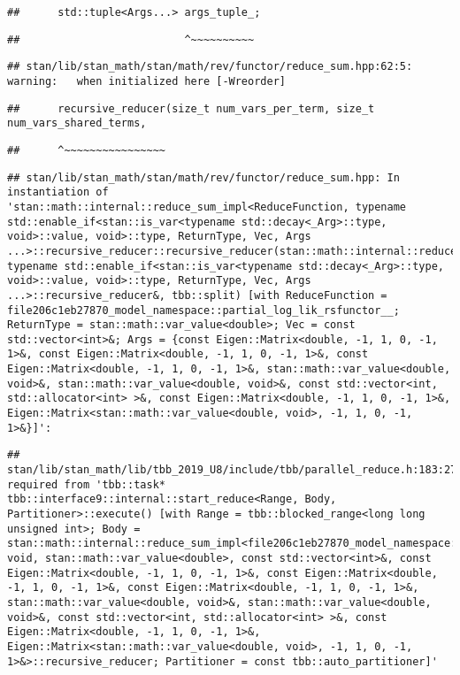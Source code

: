\documentclass[
]{article}
\begin{document}
\begin{verbatim}
##      std::tuple<Args...> args_tuple_;
\end{verbatim}

\begin{verbatim}
##                          ^~~~~~~~~~~
\end{verbatim}

\begin{verbatim}
## stan/lib/stan_math/stan/math/rev/functor/reduce_sum.hpp:62:5: warning:   when initialized here [-Wreorder]
\end{verbatim}

\begin{verbatim}
##      recursive_reducer(size_t num_vars_per_term, size_t num_vars_shared_terms,
\end{verbatim}

\begin{verbatim}
##      ^~~~~~~~~~~~~~~~~
\end{verbatim}

\begin{verbatim}
## stan/lib/stan_math/stan/math/rev/functor/reduce_sum.hpp: In instantiation of 'stan::math::internal::reduce_sum_impl<ReduceFunction, typename std::enable_if<stan::is_var<typename std::decay<_Arg>::type, void>::value, void>::type, ReturnType, Vec, Args ...>::recursive_reducer::recursive_reducer(stan::math::internal::reduce_sum_impl<ReduceFunction, typename std::enable_if<stan::is_var<typename std::decay<_Arg>::type, void>::value, void>::type, ReturnType, Vec, Args ...>::recursive_reducer&, tbb::split) [with ReduceFunction = file206c1eb27870_model_namespace::partial_log_lik_rsfunctor__; ReturnType = stan::math::var_value<double>; Vec = const std::vector<int>&; Args = {const Eigen::Matrix<double, -1, 1, 0, -1, 1>&, const Eigen::Matrix<double, -1, 1, 0, -1, 1>&, const Eigen::Matrix<double, -1, 1, 0, -1, 1>&, stan::math::var_value<double, void>&, stan::math::var_value<double, void>&, const std::vector<int, std::allocator<int> >&, const Eigen::Matrix<double, -1, 1, 0, -1, 1>&, Eigen::Matrix<stan::math::var_value<double, void>, -1, 1, 0, -1, 1>&}]':
\end{verbatim}

\begin{verbatim}
## stan/lib/stan_math/lib/tbb_2019_U8/include/tbb/parallel_reduce.h:183:27:   required from 'tbb::task* tbb::interface9::internal::start_reduce<Range, Body, Partitioner>::execute() [with Range = tbb::blocked_range<long long unsigned int>; Body = stan::math::internal::reduce_sum_impl<file206c1eb27870_model_namespace::partial_log_lik_rsfunctor__, void, stan::math::var_value<double>, const std::vector<int>&, const Eigen::Matrix<double, -1, 1, 0, -1, 1>&, const Eigen::Matrix<double, -1, 1, 0, -1, 1>&, const Eigen::Matrix<double, -1, 1, 0, -1, 1>&, stan::math::var_value<double, void>&, stan::math::var_value<double, void>&, const std::vector<int, std::allocator<int> >&, const Eigen::Matrix<double, -1, 1, 0, -1, 1>&, Eigen::Matrix<stan::math::var_value<double, void>, -1, 1, 0, -1, 1>&>::recursive_reducer; Partitioner = const tbb::auto_partitioner]'
\end{verbatim}
\end{document}
